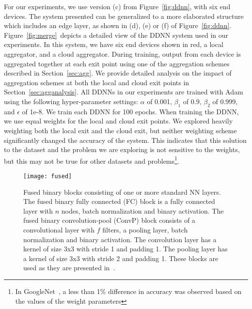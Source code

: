 \documentclass[10pt, conference, compsocconf]{IEEEtran}
\begin{document}
For our experiments, we use version (c) from Figure~\ref{fig:ddnn}, with six end devices. The system presented can be generalized to a more elaborated structure which includes an edge layer, as shown in (d), (e) or (f) of Figure~\ref{fig:ddnn}. Figure~\ref{fig:merge}~depicts a detailed view of the DDNN system used in our experiments. In this system, we have six end devices shown in red, a local aggregator, and a cloud aggregator. During training, output from each device is aggregated together at each exit point using one of the aggregation schemes described in Section~\ref{sec:agg}. We provide detailed analysis on the impact of aggregation schemes at both the local and cloud exit points in Section~\ref{sec:agganalysis}. All DDNNs in our experiments are trained with Adam~\cite{kingma2014adam} using the following hyper-parameter settings: $\alpha$ of 0.001, $\beta_1$ of 0.9, $\beta_2$ of 0.999, and $\epsilon$ of 1e-8. We train each DDNN for 100 epochs. When training the DDNN, we use equal weights for the local and cloud exit points. We explored heavily weighting both the local exit and the cloud exit, but neither weighting scheme significantly changed the accuracy of the system. This indicates that this solution to the dataset and the problem we are exploring is not sensitive to the weights, but this may not be true for other datasets and problems\footnote{In GoogleNet~\cite{szegedy2015going}, a less than 1\% difference in accuracy was observed based on the values of the weight parameters}.

\begin{figure}
    \centering
    \texttt{[image: fused]}
    \caption{Fused binary blocks consisting of one or more standard NN layers. The fused binary fully connected (FC) block is a fully connected layer with $n$ nodes, batch normalization and binary activation. The fused binary convolution-pool (ConvP) block consists of a convolutional layer with $f$ filters, a pooling layer, batch normalization and binary activation. The convolution layer has a kernel of size 3x3 with stride 1 and padding 1. The pooling layer has a kernel of size 3x3 with stride 2 and padding 1. These blocks are used as they are presented in~\cite{mcdanel2016ebnn}.}
    \label{fig:fused}
\end{figure}
\end{document}
